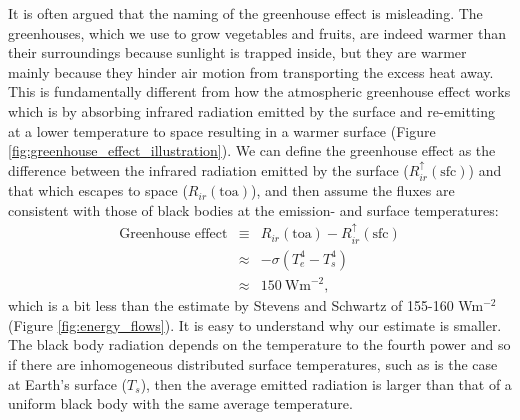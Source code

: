 \documentclass[12pt]{book}
\begin{document}
It is often argued that the naming of the greenhouse effect is misleading. The greenhouses, which we use to grow vegetables and fruits, are indeed warmer than their surroundings because sunlight is trapped inside, but they are warmer mainly because they hinder air motion from transporting the excess heat away. This is fundamentally different from how the atmospheric greenhouse effect works which is by absorbing infrared radiation emitted by the surface and re-emitting at a lower temperature to space resulting in a warmer surface (Figure \ref{fig:greenhouse_effect_illustration}). We can define the greenhouse effect as the difference between the infrared radiation emitted by the surface ($R^\uparrow_{ir}(\textrm{sfc})$) and that which escapes to space ($R_{ir}(\textrm{toa})$), and then assume the fluxes are consistent with those of black bodies at the emission- and surface temperatures:
\begin{eqnarray}
\textrm{Greenhouse effect}&\equiv&   R_{ir}(\textrm{toa}) - R^\uparrow_{ir}(\textrm{sfc}) \nonumber \\ 
                                           &\approx&   -\sigma (T_e^4 - T_s^4) \nonumber \\
                                           &\approx& 150 \ \textrm{Wm}^{-2}, \nonumber
\end{eqnarray}
which is a bit less than the estimate by Stevens and Schwartz of 155-160 Wm$^{-2}$ (Figure \ref{fig:energy_flows}). It is easy to understand why our estimate is smaller. The black body radiation depends on the temperature to the fourth power and so if there are inhomogeneous distributed surface temperatures, such as is the case at Earth's surface ($T_s$), then the average emitted radiation is larger than that of a uniform black body with the same average temperature.
\end{document}
